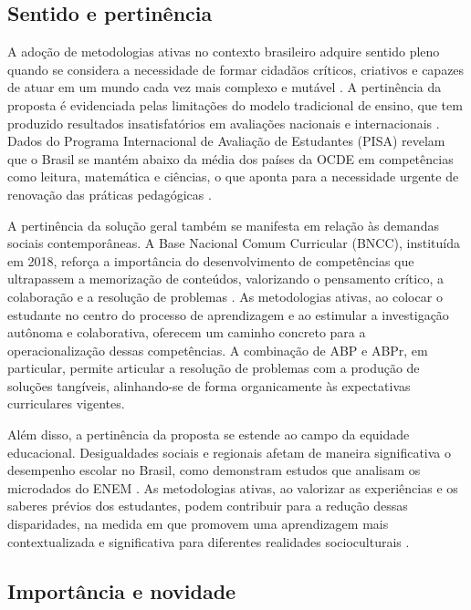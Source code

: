 \subsection{Sentido e pertinência}
\label{subsec:jg_sentido}

A adoção de metodologias ativas no contexto brasileiro adquire sentido pleno quando se considera a necessidade de formar cidadãos críticos, criativos e capazes de atuar em um mundo cada vez mais complexo e mutável \cite{MORAN2018}. A pertinência da proposta é evidenciada pelas limitações do modelo tradicional de ensino, que tem produzido resultados insatisfatórios em avaliações nacionais e internacionais \cite{MENEZES2020}. Dados do Programa Internacional de Avaliação de Estudantes (PISA) revelam que o Brasil se mantém abaixo da média dos países da OCDE em competências como leitura, matemática e ciências, o que aponta para a necessidade urgente de renovação das práticas pedagógicas \cite{OECD2019}.

A pertinência da solução geral também se manifesta em relação às demandas sociais contemporâneas. A Base Nacional Comum Curricular (BNCC), instituída em 2018, reforça a importância do desenvolvimento de competências que ultrapassem a memorização de conteúdos, valorizando o pensamento crítico, a colaboração e a resolução de problemas \cite{BRASIL2018}. As metodologias ativas, ao colocar o estudante no centro do processo de aprendizagem e ao estimular a investigação autônoma e colaborativa, oferecem um caminho concreto para a operacionalização dessas competências. A combinação de ABP e ABPr, em particular, permite articular a resolução de problemas com a produção de soluções tangíveis, alinhando-se de forma organicamente às expectativas curriculares vigentes.

Além disso, a pertinência da proposta se estende ao campo da equidade educacional. Desigualdades sociais e regionais afetam de maneira significativa o desempenho escolar no Brasil, como demonstram estudos que analisam os microdados do ENEM \cite{CALLEGARIO2025}. As metodologias ativas, ao valorizar as experiências e os saberes prévios dos estudantes, podem contribuir para a redução dessas disparidades, na medida em que promovem uma aprendizagem mais contextualizada e significativa para diferentes realidades socioculturais \cite{SILVA2023}.

\subsection{Importância e novidade}
\label{subsec:jg_importancia}

